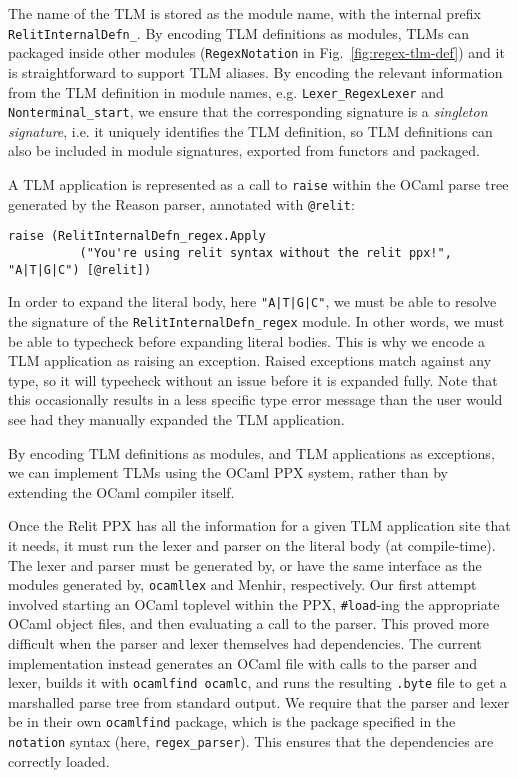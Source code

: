 \documentclass[acmsmall,review]{acmart}
\newcommand{\li}[1]{\lstinline[basicstyle=\ttfamily\fontsize{9pt}{1em}\selectfont]{#1}}
\theoremstyle{slplain}
\numberwithin{thm}{section}
\begin{document}
The name of the TLM is stored as the module name, with the internal prefix \li{RelitInternalDefn_}. By encoding TLM definitions as modules, TLMs can packaged inside other modules (\li{RegexNotation} in Fig.~\ref{fig:regex-tlm-def}) and it is straightforward to support TLM aliases. By encoding the relevant information from the TLM definition in module names, e.g. \li{Lexer_RegexLexer} and \li{Nonterminal_start}, we ensure that the corresponding signature is a \emph{singleton signature}, i.e. it uniquely identifies the TLM definition, so TLM definitions can also be included in module signatures, exported from functors and packaged.

A TLM application is represented as a call to \li{raise} within the OCaml parse tree generated by the Reason parser, annotated with \li{@relit}:
\begin{lstlisting}[numbers=none]
  raise (RelitInternalDefn_regex.Apply
          ("You're using relit syntax without the relit ppx!", "A|T|G|C") [@relit])
\end{lstlisting}

In order to expand the literal body, here \li{"A|T|G|C"}, we must be able to resolve the signature of the \li{RelitInternalDefn_regex} module. In other words, we must be able to typecheck before expanding literal bodies. This is why we encode a TLM application as raising an exception. Raised exceptions match against any type, so it will typecheck without an issue before it is expanded fully. Note that this occasionally results in a less specific type error message than the user would see had they manually expanded the TLM application.

By encoding TLM definitions as modules, and TLM applications as exceptions, we can implement TLMs using the OCaml PPX system, rather than by extending the OCaml compiler itself. 

Once the Relit PPX has all the information for a given TLM application site that it needs, it must run the lexer and parser on the literal body (at compile-time).  The lexer and parser must be generated by, or have the same interface as the modules generated by, \li{ocamllex} and Menhir, respectively. Our first attempt involved starting an OCaml toplevel within the PPX, \li{#load}-ing the appropriate OCaml object files, and then evaluating a call to the parser. This proved more difficult when the parser and lexer themselves had dependencies. The current implementation instead generates an OCaml file with calls to the parser and lexer, builds it with \li{ocamlfind ocamlc}, and runs the resulting \li{.byte} file to get a marshalled parse tree from standard output. We require that the parser and lexer be in their own \li{ocamlfind} package, which is the package specified in the \li{notation} syntax (here, \li{regex_parser}). This ensures that the dependencies are correctly loaded.
\end{document}

